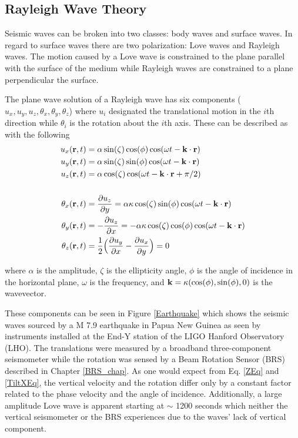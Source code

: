 \documentclass [12pt, proquest]{uwthesis}[2019]
\begin{document}
\subsection{Rayleigh Wave Theory}

Seismic waves can be broken into two classes: body waves and surface waves. In regard to surface waves there are two polarization: Love waves and Rayleigh waves. The motion caused by a Love wave is constrained to the plane parallel with the surface of the medium while Rayleigh waves are constrained to a plane perpendicular the surface. 

The plane wave solution of a Rayleigh wave has six components ($u_x, u_y, u_z, \theta_x, \theta_y, \theta_z$) where $u_i$ designated the translational motion in the $i$th direction while $\theta_i$ is the rotation about the $i$th axis.
These can be described as with the following \cite{seismic}
\begin{align}
u_x({\bf r} ,t)&=\alpha \sin(\zeta) \cos(\phi) \cos(\omega t-{\bf k}\cdot{\bf r})\label{XEq}\\
u_y({\bf r} ,t)&=\alpha \sin(\zeta) \sin(\phi) \cos(\omega t-{\bf k}\cdot{\bf r})\\
u_z({\bf r} ,t)&=\alpha \cos(\zeta) \cos(\omega t-{\bf k}\cdot{\bf r}+\pi/2)\label{ZEq}\\
\notag \\
\theta_x({\bf r} ,t)&=\frac{\partial u_z}{\partial y}=\alpha \kappa \cos(\zeta) \sin(\phi) \cos(\omega t-{\bf k}\cdot{\bf r})\label{TiltXEq}\\
\theta_y({\bf r} ,t)&=-\frac{\partial u_z}{\partial x}=-\alpha \kappa \cos(\zeta) \cos(\phi) \cos(\omega t-{\bf k}\cdot{\bf r})\\
\theta_z({\bf r} ,t)&=\frac{1}{2}\Big(\frac{\partial u_y}{\partial x}-\frac{\partial u_x}{\partial y}\Big)=0
\end{align}

where $\alpha$ is the amplitude, $\zeta$ is the ellipticity angle, $\phi$ is the angle of incidence in the horizontal plane, $\omega$ is the frequency, and $\bf{k}=\kappa (\cos(\phi),\sin(\phi),\text{0})$ is the wavevector.

These components can be seen in Figure \ref{Earthquake} which shows the seismic waves sourced by a M 7.9 earthquake in Papua New Guinea as seen by instruments installed at the End-Y station of the LIGO Hanford Observatory (LHO). The translations were measured by a broadband three-component seismometer while the rotation was sensed by a Beam Rotation Sensor (BRS) described in Chapter \ref{BRS_chap}. As one would expect from Eq. \ref{ZEq} and \ref{TiltXEq}, the vertical velocity and the rotation differ only by a constant factor related to the phase velocity and the angle of incidence. Additionally, a large amplitude Love wave is apparent starting at $\sim$ 1200 seconds which neither the vertical seismometer or the BRS experiences due to the waves' lack of vertical component.
\end{document}
